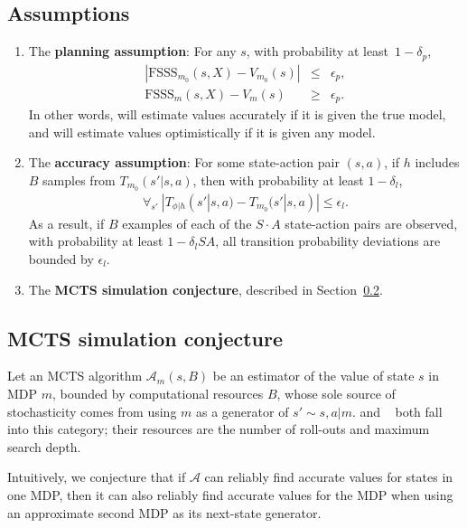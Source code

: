 \subsection{Assumptions}
\begin{enumerate}
\item \label{fsss-acc} The {\bf planning assumption}: For any $s$, with probability at least\ $1-\delta_p$, 
\begin{eqnarray}
|\mbox{FSSS}_{m_0}(s, X)-V_{m_0}(s)| &\leq& \epsilon_p,\\
\mbox{FSSS}_{m}(s, X) - V_{m}(s) &\geq&\epsilon_p.
\end{eqnarray}
In other words,  will estimate values accurately if it is given the true model, and will estimate values optimistically if it is given any model.
\item \label{sa-bound} The {\bf accuracy assumption}: For some state-action pair $(s,a)$, if $h$ includes $B$ samples from $T_{m_0}(s'|s,a)$, then with probability at least $1-\delta_l$,
\begin{eqnarray}
\forall_{s'}~|T_{\phi|h}(s'|s,a) - T_{m_0}(s'|s,a)| \leq \epsilon_l.
\end{eqnarray}
As a result, if $B$ examples of each of the $S\cdot A$ state-action pairs are observed, with probability at least $1-\delta_l S A$, all transition probability deviations are bounded by $\epsilon_l$.

\item The {\bf MCTS simulation conjecture}, described in Section~\ref{mcts-conj}.
\end{enumerate}



\subsection{MCTS simulation conjecture}
\label{mcts-conj}

Let an MCTS algorithm $\mathcal{A}_m(s,B)$ be an estimator of the value of state $s$ in MDP $m$, bounded by computational resources $B$, whose sole source of stochasticity comes from using $m$ as a generator of $s'\sim s,a|m$.  and ~\cite{kocsis06} both fall into this category; their resources are the number of roll-outs and maximum search depth.

Intuitively, we conjecture that if $\mathcal{A}$ can reliably find accurate values for states in one MDP, then it can also reliably find accurate values for the MDP when using an approximate second MDP as its next-state generator.

